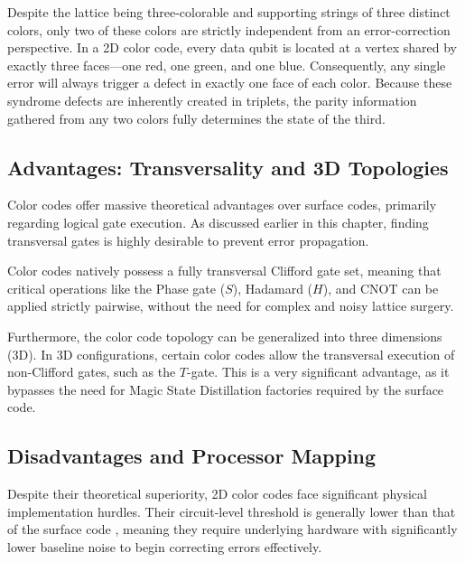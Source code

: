 Despite the lattice being three-colorable and supporting strings of three distinct colors, only two of these colors are strictly independent from an error-correction perspective. In a 2D color code, every data qubit is located at a vertex shared by exactly three faces---one red, one green, and one blue. Consequently, any single error will always trigger a defect in exactly one face of each color. Because these syndrome defects are inherently created in triplets, the parity information gathered from any two colors fully determines the state of the third.

\subsection{Advantages: Transversality and 3D Topologies}
Color codes offer massive theoretical advantages over surface codes, primarily regarding logical gate execution. As discussed earlier in this chapter, finding transversal gates is highly desirable to prevent error propagation. 

Color codes natively possess a fully transversal Clifford gate set, meaning that critical operations like the Phase gate ($S$), Hadamard ($H$), and CNOT can be applied strictly pairwise, without the need for complex and noisy lattice surgery. 

 Furthermore, the color code topology can be generalized into three dimensions (3D). In 3D configurations, certain color codes allow the transversal execution of non-Clifford gates, such as the $T$-gate. This is a very significant advantage, as it bypasses the need for Magic State Distillation factories required by the surface code.

\subsection{Disadvantages and Processor Mapping}
Despite their theoretical superiority, 2D color codes face significant physical implementation hurdles. Their circuit-level threshold is generally lower than that of the surface code \cite{landahl2011fault}, meaning they require underlying hardware with significantly lower baseline noise to begin correcting errors effectively.


